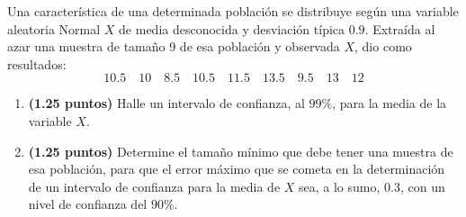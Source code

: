 
Una característica de una determinada población se distribuye según una variable aleatoria Normal $X$ de media desconocida y desviación típica $0.9$. Extraída al azar una muestra de tamaño 9 de esa población y observada $X$, dio como resultados:
\[
10.5\quad10\quad8.5\quad10.5\quad11.5\quad13.5\quad9.5\quad13\quad12
\]
\begin{enumerate}[label=\alph*)]
\item \textbf{(1.25 puntos)} Halle un intervalo de confianza, al $99\%$, para la media de la variable $X$.
\item \textbf{(1.25 puntos)} Determine el tamaño mínimo que debe tener una muestra de esa población, para que el error máximo que se cometa en la determinación de un intervalo de confianza para la media de $X$ sea, a lo sumo, $0.3$, con un nivel de confianza del $90\%$.
\end{enumerate}
